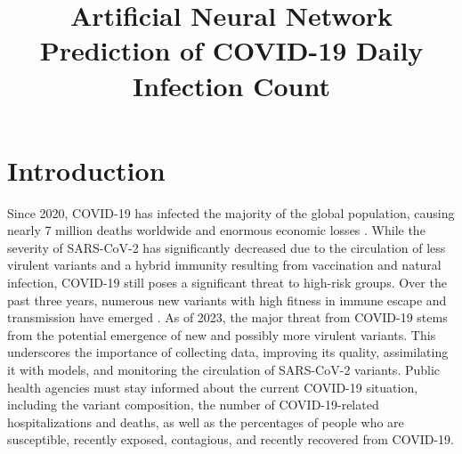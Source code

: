 \documentclass[sn-mathphys,Numbered]{sn-jnl}
\begin{document}
\title[COVID-19 prediction]{Artificial Neural Network Prediction of COVID-19 Daily Infection Count}

\author[1]{ }

\author[1]{ }

\author*[1]{ }





\maketitle

\section{Introduction}
Since 2020, COVID-19 has infected the majority of the global population, causing nearly 7 million deaths worldwide and enormous economic losses \cite{WHO}. While the severity of SARS-CoV-2 has significantly decreased due to the circulation of less virulent variants and a hybrid immunity resulting from vaccination and natural infection, COVID-19 still poses a significant threat to high-risk groups. Over the past three years, numerous new variants with high fitness in immune escape and transmission have emerged \cite{harvey2021sars}. As of 2023, the major threat from COVID-19 stems from the potential emergence of new and possibly more virulent variants. This underscores the importance of collecting data, improving its quality, assimilating it with models, and monitoring the circulation of SARS-CoV-2 variants. Public health agencies must stay informed about the current COVID-19 situation, including the variant composition, the number of COVID-19-related hospitalizations and deaths, as well as the percentages of people who are susceptible, recently exposed, contagious, and recently recovered from COVID-19. 
\end{document}
